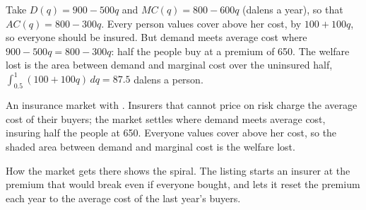 Take $D(q) = 900 - 500q$ and $\mathit{MC}(q) = 800 - 600q$ (dalens a year), so that $\mathit{AC}(q) = 800 - 300q$. Every person values cover above her
cost, by $100 + 100q$, so everyone should be insured. But demand meets average cost where $900 - 500q = 800 - 300q$: half the people buy
at a premium of 650. The welfare lost is the area between demand and marginal cost over the uninsured half, $\int_{0.5}^1 (100 +
100q)\,dq = 87.5$ dalens a person.

\begin{omfigure}

{\small An insurance market with . Insurers that cannot price on risk charge the average cost of their
buyers; the market settles where demand meets average cost, insuring half the people at 650. Everyone values cover above
her cost, so the shaded area between demand and marginal cost is the welfare lost.}
\end{omfigure}

How the market gets there shows the spiral. The listing starts an insurer at the premium that would break even if
everyone bought, and lets it reset the premium each year to the average cost of the last year's buyers.

\label{lst:b2:adverse-selection:unravelling}

